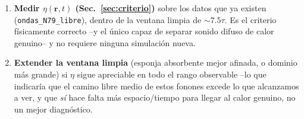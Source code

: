 \documentclass[11pt,a4paper]{article}
\begin{document}
\begin{enumerate}[leftmargin=1.4em]
\item \textbf{Medir $\eta(\mathbf r,t)$ (Sec.~\ref{sec:criterio})} sobre los
datos que ya existen (\texttt{ondas\_N79\_libre}), dentro de la ventana
limpia de $\sim7.5\tau$. Es el criterio físicamente correcto --y el único
capaz de separar sonido difuso de calor genuino-- y no requiere ninguna
simulación nueva.
\item \textbf{Extender la ventana limpia} (esponja absorbente mejor
afinada, o dominio más grande) si $\eta$ sigue apreciable en todo el rango
observable --lo que indicaría que el camino libre medio de estos fonones
excede lo que alcanzamos a ver, y que \emph{sí} hace falta más espacio/tiempo
para llegar al calor genuino, no un mejor diagnóstico.
\end{enumerate}
\end{document}
